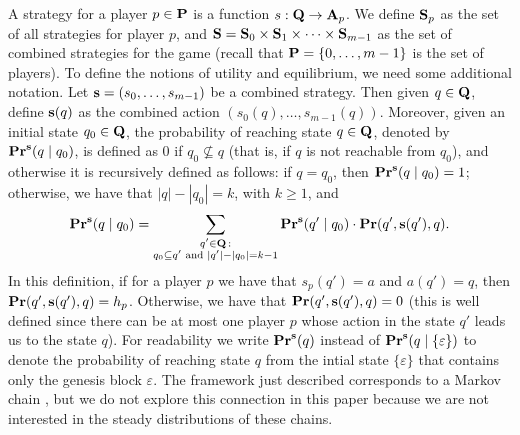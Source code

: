 A strategy for a player $p \in \mathbf{P}$ is a function $s : \mathbf{Q} \rightarrow \mathbf{A}_p$.
We define $\mathbf{S}_p$ as the set of all strategies for player $p$, and $\mathbf{S} = \mathbf{S}_0 \times \mathbf{S}_{1} \times \cdots \times \mathbf{S}_{m-1}$ as the set of combined strategies for the game (recall 
that $\mathbf{P} = \{0, \ldots, m-1\}$ is the set of players).
To define the notions of utility and equilibrium, we need some additional notation.
Let $\mathbf{s} = (s_0, \ldots, s_{m-1})$ be a combined strategy.
Then given $q \in \mathbf{Q}$, define $\mathbf{s}(q)$ as the combined action $(s_0(q), \ldots, s_{m-1}(q))$. Moreover, given an initial state $q_0 \in \mathbf{Q}$,
the probability of reaching state $q \in \mathbf{Q}$, denoted by $\mathbf{Pr}^{\mathbf{s}}(q \mid q_0)$, is defined as 0 if $q_0 \not\subseteq q$ (that is, if $q$ is not reachable from $q_0$), and otherwise it is recursively defined as follows: if $q = q_0$, then $\mathbf{Pr}^{\mathbf{s}}(q \mid q_0) = 1$; otherwise, we have that $|q| - |q_0| = k$, with $k \geq 1$, and
$$
\mathbf{Pr}^{\mathbf{s}}(q \mid q_0) =
\sum_{\substack{q' \in \mathbf{Q} \,:\\ q_0 \subseteq q' \text{ and } |q'| - |q_0| = k-1}}
 \mathbf{Pr}^{\mathbf{s}}(q' \mid q_0) \cdot \mathbf{Pr}(q', \mathbf{s}(q'), q).
 $$
In this definition, if for a player $p$ we have that $s_p(q') = a$ and $a(q') = q$, then $\mathbf{Pr}(q', \mathbf{s}(q'), q) = h_p$. Otherwise, we have that $\mathbf{Pr}(q', \mathbf{s}(q'), q) = 0$ 
(this is well defined since there can be at most one player $p$ whose action in the state $q'$ leads us to the state $q$). 
For readability we write $\mathbf{Pr}^{\mathbf{s}}(q)$ instead of $\mathbf{Pr}^{\mathbf{s}}(q \mid \{\varepsilon\})$ to denote the probability of reaching state $q$ from the intial state $\{\varepsilon\}$ that contains 
only the genesis block  $\varepsilon$. 
The framework just described corresponds to a Markov chain \cite{MU05}, but we do not explore this connection in this paper because we are not interested in the steady distributions of these chains. 


